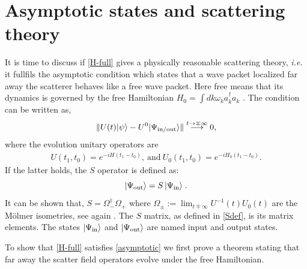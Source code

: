 \documentclass[notitlepage, prx, preprint, amsmath,superscriptaddress,amssymb]{revtex4-1}
\begin{document}




\section{Asymptotic states and scattering theory}

It is time to discuss if \eqref{H-full} gives a physically reasonable scattering theory, \emph{i.e.} it fullfils the  asymptotic condition which states that a wave packet localized far away the scatterer behaves like a free wave packet.  Here free means that its dynamics is governed by the free Hamiltonian $H_0 = \int dk \omega_k a_k^\dagger a_k$ \cite{Taylor1972}.  The condition can be written as,
\begin{equation}
\label{asymptotic}
\Vert U(t) | \psi \rangle - U^0 |\Psi_{\rm in /out} \rangle \Vert \stackrel{t\to \mp \infty}{\longrightarrow} 0,
\end{equation}
where the evolution unitary operators are
\begin{align}
U(t_1,t_0) = e^{-iH(t_1-t_0)},~\mbox{and}~ U_0(t_1,t_0)= e^{-iH_0(t_1-t_0)}.
\end{align}
If the latter holds, the $S$ operator  is defined as:
\begin{equation}
\label{Sinout}
\vert \Psi_{\rm out} \rangle = S \,  \vert \Psi_{\rm in} \rangle  \;.
\end{equation}
It can be shown that, $S = \Omega_-^\dagger \Omega_+$ where $\Omega_\pm := \lim_{t \mp \infty} U^{-1} (t) U_0 (t)$ are the M\"  olmer isometries, see again \cite{Taylor1972}. {\color{red}The $S$ matrix, as defined in  \eqref{Sdef}, is its matrix elements.}  The  states $| \Psi_{\rm in} \rangle$ and $|\Psi_{\rm out} \rangle$ are  named input and output states.
 

To show that \eqref{H-full} satisfies \eqref{asymptotic} we first prove a theorem stating that far away the scatter field operators evolve under the free Hamiltonian.
\end{document}
